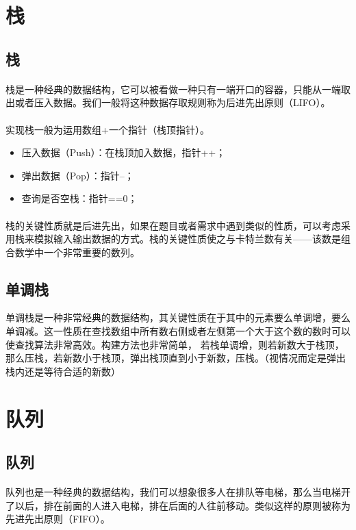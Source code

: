 \documentclass[12pt,a4paper,UTF16]{ctexbook}
\theoremstyle{plain}
\begin{document}
\section{栈}
\subsection{栈}
\paragraph{}栈是一种经典的数据结构，它可以被看做一种只有一端开口的容器，只能从一端取出或者压入数据。我们一般将这种数据存取规则称为后进先出原则（LIFO）。
\paragraph{}实现栈一般为运用数组+一个指针（栈顶指针）。
\begin{itemize}
\item 压入数据（Push）：在栈顶加入数据，指针++；
\item 弹出数据（Pop）：指针--；
\item 查询是否空栈：指针==0；
\end{itemize}
\paragraph{}栈的关键性质就是后进先出，如果在题目或者需求中遇到类似的性质，可以考虑采用栈来模拟输入输出数据的方式。栈的关键性质使之与卡特兰数有关——该数是组合数学中一个非常重要的数列。
\subsection{单调栈}
单调栈是一种非常经典的数据结构，其关键性质在于其中的元素要么单调增，要么单调减。这一性质在查找数组中所有数右侧或者左侧第一个大于这个数的数时可以使查找算法非常高效。构建方法也非常简单，
若栈单调增，则若新数大于栈顶，那么压栈，若新数小于栈顶，弹出栈顶直到小于新数，压栈。（视情况而定是弹出栈内还是等待合适的新数）
\section{队列}
\subsection{队列}

\paragraph{}队列也是一种经典的数据结构，我们可以想象很多人在排队等电梯，那么当电梯开了以后，排在前面的人进入电梯，排在后面的人往前移动。类似这样的原则被称为先进先出原则（FIFO）。
\end{document}
